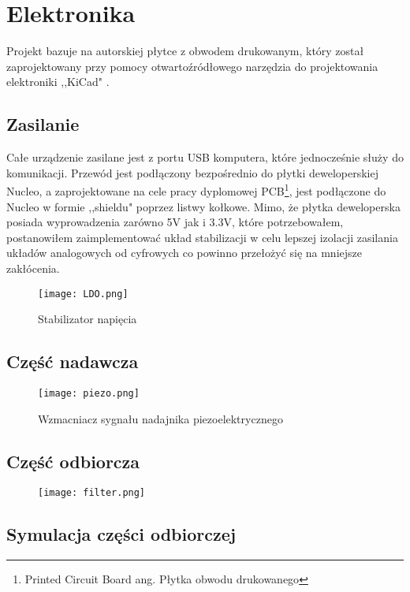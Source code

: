 \section{Elektronika}
Projekt bazuje na autorskiej płytce z obwodem drukowanym, który został zaprojektowany przy pomocy 
otwartoźródłowego narzędzia do projektowania elektroniki ,,KiCad" \cite{kicad}.

\subsection{Zasilanie}
Całe urządzenie zasilane jest z portu USB komputera, które jednocześnie służy do komunikacji. 
Przewód jest podłączony bezpośrednio do płytki deweloperskiej Nucleo, 
a zaprojektowane na cele pracy dyplomowej PCB\footnote[1]{Printed Circuit Board ang. Płytka obwodu drukowanego}, 
jest podłączone do Nucleo w formie ,,shieldu" poprzez listwy kołkowe. 
Mimo, że płytka deweloperska posiada wyprowadzenia zarówno 5V jak i 3.3V, które potrzebowałem, 
postanowiłem zaimplementować układ stabilizacji w celu lepszej izolacji zasilania układów analogowych od cyfrowych co powinno przełożyć się na mniejsze zakłócenia.
\begin{figure}[ht!]
    \centering
    \texttt{[image: LDO.png]}
    \caption{Stabilizator napięcia}
    \label{fig:ldo}
\end{figure}


\subsection{Część nadawcza}

\begin{figure}[ht!]
    \centering
    \texttt{[image: piezo.png]}
    \caption{Wzmacniacz sygnału nadajnika piezoelektrycznego}
    \label{fig:piezo}
\end{figure}

\subsection{Część odbiorcza}
\begin{figure}[ht!]
    \centering
    \texttt{[image: filter.png]}
\end{figure}

\subsection{Symulacja części odbiorczej}
